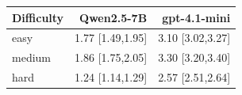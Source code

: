 \begin{tabular}{lrr}
\toprule
Difficulty & Qwen2.5-7B & gpt-4.1-mini \\
\midrule
easy & 1.77 [1.49,1.95] & 3.10 [3.02,3.27] \\
medium & 1.86 [1.75,2.05] & 3.30 [3.20,3.40] \\
hard & 1.24 [1.14,1.29] & 2.57 [2.51,2.64] \\
\bottomrule
\end{tabular}